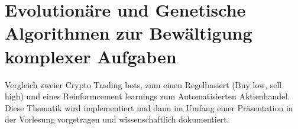 \chapter{Evolutionäre und Genetische Algorithmen zur Bewältigung komplexer Aufgaben}

Vergleich zweier Crypto Trading bots, zum einen Regelbasiert (Buy low, sell high) und eines Reinformcement learnings zum Automatisierten Aktienhandel. Diese Thematik wird implementiert und dann im Umfang einer Präsentation in der Vorlesung vorgetragen und wissenschaftlich dokumentiert.
